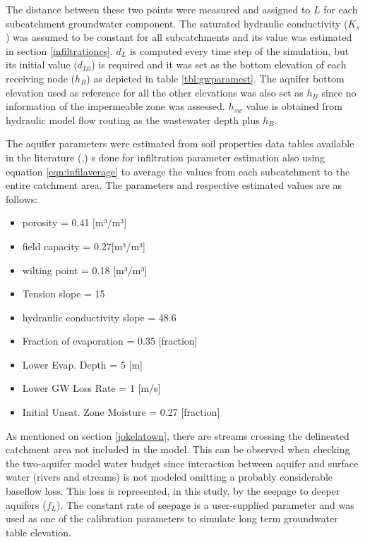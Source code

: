 The distance between these two points were measured and assigned to $L$ for each subcatchment groundwater component. The saturated hydraulic conductivity ($K_s$) was assumed to be constant for all subcatchments and its value was estimated in section \ref{infiltrationcs}. $d_L$ is computed every time step of the simulation, but its initial value ($d_{L0}$) is required and it was set as the bottom elevation of each receiving node ($h_B$) as depicted in table \ref{tbl:gwparamest}. The aquifer bottom elevation used as reference for all the other elevations was also set as $h_B$ since no information of the impermeable zone was assessed. $h_{sw}$ value is obtained from hydraulic model flow routing as the wastewater depth plus $h_B$.

The aquifer parameters were estimated from soil properties data tables available in the literature (\cite{Rawls1983},\cite{Rossman2016}) s done for infiltration parameter estimation also using equation \ref{eqn:infilaverage} to average the values from each subcatchment to the entire catchment area. The parameters and respective estimated values are as follows:

\begin{itemize}
    \item porosity = 0.41 [m³/m³]
    \item field capacity = 0.27[m³/m³]
    \item wilting point = 0.18 [m³/m³]
    \item Tension slope = 15
    \item hydraulic conductivity slope = 48.6
    \item Fraction of evaporation = 0.35 [fraction] 
    \item Lower Evap. Depth = 5 [m]
    \item Lower GW Loss Rate = 1 [m/s]
    \item Initial Unsat. Zone Moisture = 0.27 [fraction]
\end{itemize}

As mentioned on section \ref{jokelatown}, there are streams crossing the delineated catchment area not included in the model. This can be observed when checking the two-aquifer model water budget since interaction between aquifer and surface water (rivers and streams) is not modeled omitting a probably considerable baseflow loss. This loss is represented, in this study, by the seepage to deeper aquifers ($f_L$). The constant rate of seepage is a user-supplied parameter and was used as one of the calibration parameters to simulate long term groundwater table elevation. 

